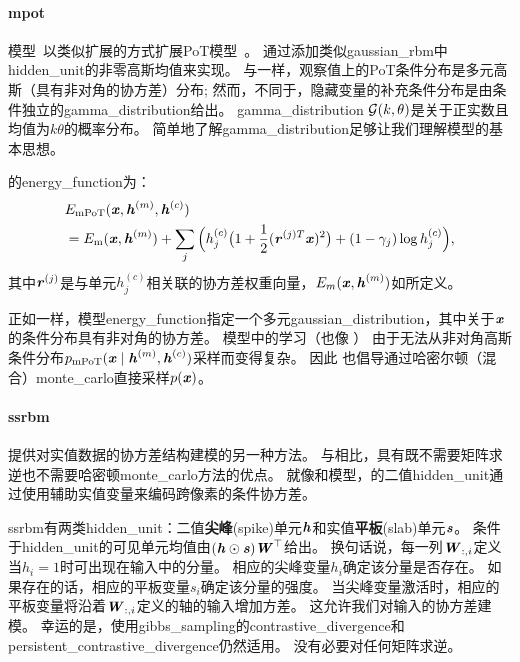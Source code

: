  
\paragraph{\gls{mpot}}
模型~\citep{ranzato+mnih+hinton:2010-short}以类似扩展的方式扩展PoT模型~\citep{Welling2003a-small}。
通过添加类似\gls{gaussian_rbm}中\gls{hidden_unit}的非零高斯均值来实现。
与一样，观察值上的PoT条件分布是多元高斯（具有非对角的协方差）分布; 然而，不同于，隐藏变量的补充条件分布是由条件独立的\gls{gamma_distribution}给出。
\gls{gamma_distribution} $\mathcal{G}(k, \theta)$是关于正实数且均值为$k\theta$的概率分布。
简单地了解\gls{gamma_distribution}足够让我们理解模型的基本思想。

的\gls{energy_function}为：
\begin{align}
 &E_{\text{mPoT}}(\boldsymbol{\mathit{x}}, \boldsymbol{\mathit{h}}^{(m)}, \boldsymbol{\mathit{h}}^{(c)}) \\
 &= E_{\text{m}}(\boldsymbol{\mathit{x}}, \boldsymbol{\mathit{h}}^{(m)}) + \sum_j \Big( h_j^{(c)} \big( 1+\frac{1}{2}(\boldsymbol{\mathit{r}}^{(j)T}\boldsymbol{\mathit{x}})^2  \big)
 +(1-\gamma_j)\log h_j^{(c)} \Big),
\end{align}
其中$\boldsymbol{\mathit{r}}^{(j)}$是与单元$h_j^{(c)}$相关联的协方差权重向量，$E_m(\boldsymbol{\mathit{x}}, \boldsymbol{\mathit{h}}^{(m)})$如所定义。

正如一样，模型\gls{energy_function}指定一个多元\gls{gaussian_distribution}，其中关于$\boldsymbol{\mathit{x}}$的条件分布具有非对角的协方差。
模型中的学习（也像 ） 由于无法从非对角高斯条件分布$p_{\text{mPoT}}(\boldsymbol{\mathit{x}}  \mid  \boldsymbol{\mathit{h}}^{(m)}, \boldsymbol{\mathit{h}}^{(c)}) $采样而变得复杂。
因此\citet{ranzato+mnih+hinton:2010-short} 也倡导通过哈密尔顿（混合）\gls{monte_carlo}直接采样$p(\boldsymbol{\mathit{x}})$。


\paragraph{\gls{ssrbm}} \citep{Courville+al-2011}提供对实值数据的协方差结构建模的另一种方法。
与相比，具有既不需要矩阵求逆也不需要哈密顿\gls{monte_carlo}方法的优点。
就像和模型，的二值\gls{hidden_unit}通过使用辅助实值变量来编码跨像素的条件协方差。


\gls{ssrbm}有两类\gls{hidden_unit}：二值\textbf{尖峰}(spike)单元$\boldsymbol{\mathit{h}}$和实值\textbf{平板}(slab)单元$\boldsymbol{\mathit{s}}$。
条件于\gls{hidden_unit}的可见单元均值由$(\boldsymbol{\mathit{h}} \odot \boldsymbol{\mathit{s}})\boldsymbol{\mathit{W}}^\top$给出。
换句话说，每一列$\boldsymbol{\mathit{W}}_{:,i}$定义当$h_i=1$时可出现在输入中的分量。
相应的尖峰变量$h_i$确定该分量是否存在。
如果存在的话，相应的平板变量$s_i$确定该分量的强度。
当尖峰变量激活时，相应的平板变量将沿着$\boldsymbol{\mathit{W}}_{:,i}$定义的轴的输入增加方差。
这允许我们对输入的协方差建模。
幸运的是，使用\gls{gibbs_sampling}的\gls{contrastive_divergence}和\gls{persistent_contrastive_divergence}仍然适用。
没有必要对任何矩阵求逆。

